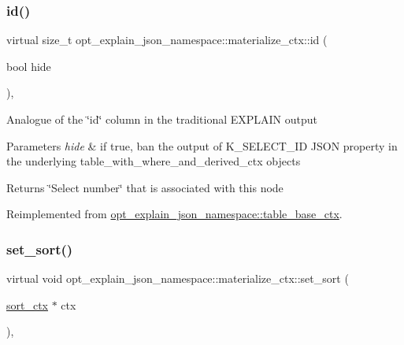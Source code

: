 \subsubsection{\texorpdfstring{id()}{id()}}
{\footnotesize\ttfamily virtual size\+\_\+t opt\+\_\+explain\+\_\+json\+\_\+namespace\+::materialize\+\_\+ctx\+::id (\begin{DoxyParamCaption}\item[{bool}]{hide }\end{DoxyParamCaption})\hspace{0.3cm}{\ttfamily [inline]}, {\ttfamily [virtual]}}

Analogue of the \char`\"{}id\char`\"{} column in the traditional E\+X\+P\+L\+A\+IN output


\begin{DoxyParams}{Parameters}
{\em hide} & if true, ban the output of K\+\_\+\+S\+E\+L\+E\+C\+T\+\_\+\+ID J\+S\+ON property in the underlying table\+\_\+with\+\_\+where\+\_\+and\+\_\+derived\+\_\+ctx objects\\
\hline
\end{DoxyParams}
\begin{DoxyReturn}{Returns}
\char`\"{}\+Select number\char`\"{} that is associated with this node 
\end{DoxyReturn}


Reimplemented from \mbox{\hyperlink{classopt__explain__json__namespace_1_1table__base__ctx_afc1c98638ff3c4cc5b33ef99164cb144}{opt\+\_\+explain\+\_\+json\+\_\+namespace\+::table\+\_\+base\+\_\+ctx}}.

\mbox{\label{classopt__explain__json__namespace_1_1materialize__ctx_a88d221b18598fa4bcdb77cafabb8e7be}} 
\subsubsection{\texorpdfstring{set\+\_\+sort()}{set\_sort()}}
{\footnotesize\ttfamily virtual void opt\+\_\+explain\+\_\+json\+\_\+namespace\+::materialize\+\_\+ctx\+::set\+\_\+sort (\begin{DoxyParamCaption}\item[{\mbox{\hyperlink{classopt__explain__json__namespace_1_1sort__ctx}{sort\+\_\+ctx}} $\ast$}]{ctx }\end{DoxyParamCaption})\hspace{0.3cm}{\ttfamily [inline]}, {\ttfamily [virtual]}}

